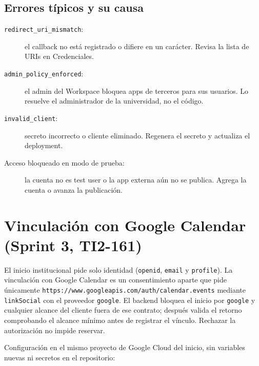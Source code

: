 \documentclass[11pt,a4paper]{article}
\begin{document}
\subsection{Errores típicos y su causa}

\begin{description}
  \item[\texttt{redirect\_uri\_mismatch}:] el callback no está registrado o
    difiere en un carácter. Revisa la lista de URIs en Credenciales.
  \item[\texttt{admin\_policy\_enforced}:] el admin del Workspace bloquea apps
    de terceros para sus usuarios. Lo resuelve el administrador de la
    universidad, no el código.
  \item[\texttt{invalid\_client}:] secreto incorrecto o cliente eliminado.
    Regenera el secreto y actualiza el deployment.
  \item[Acceso bloqueado en modo de prueba:] la cuenta no es test user o la
    app externa aún no se publica. Agrega la cuenta o avanza la publicación.
\end{description}

\section{Vinculación con Google Calendar (Sprint 3, TI2-161)}

El inicio institucional pide solo identidad (\texttt{openid}, \texttt{email} y
\texttt{profile}). La vinculación con Google Calendar es un consentimiento
aparte que pide únicamente
\texttt{https://www.googleapis.com/auth/calendar.events} mediante
\texttt{linkSocial} con el proveedor \texttt{google}. El backend bloquea el
inicio por \texttt{google} y cualquier alcance del cliente fuera de ese
contrato; después valida el retorno comprobando el alcance mínimo antes de
registrar el vínculo. Rechazar la autorización no impide reservar.

Configuración en el mismo proyecto de Google Cloud del inicio, sin variables
nuevas ni secretos en el repositorio:
\end{document}
